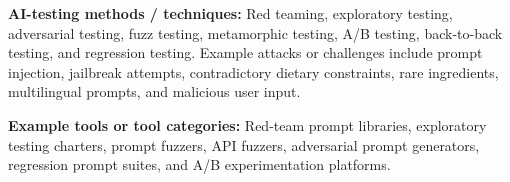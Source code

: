 \documentclass[
  letterpaper,
  DIV=11,
  numbers=noendperiod,
  oneside]{scrreprt}
\begin{document}
\begin{tcolorbox}[enhanced jigsaw, arc=.35mm, bottomrule=.15mm, bottomtitle=1mm, breakable, colback=white, colbacktitle=quarto-callout-tip-color!10!white, colframe=quarto-callout-tip-color-frame, coltitle=black, left=2mm, leftrule=.75mm, opacityback=0, opacitybacktitle=0.6, rightrule=.15mm, title=\textcolor{quarto-callout-tip-color}{\faLightbulb}\hspace{0.5em}{Do we perform red teaming, exploratory testing, adversarial testing, or
metamorphic testing?}, titlerule=0mm, toprule=.15mm, toptitle=1mm]

\textbf{AI-testing methods / techniques:} Red teaming, exploratory
testing, adversarial testing, fuzz testing, metamorphic testing, A/B
testing, back-to-back testing, and regression testing. Example attacks
or challenges include prompt injection, jailbreak attempts,
contradictory dietary constraints, rare ingredients, multilingual
prompts, and malicious user input.

\textbf{Example tools or tool categories:} Red-team prompt libraries,
exploratory testing charters, prompt fuzzers, API fuzzers, adversarial
prompt generators, regression prompt suites, and A/B experimentation
platforms.

\end{tcolorbox}
\end{document}
